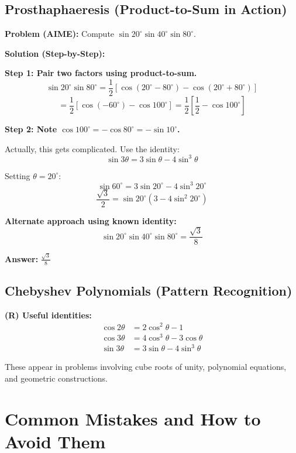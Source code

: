 \documentclass[12pt]{extarticle}
\begin{document}
\subsection{Prosthaphaeresis (Product-to-Sum in Action)}

\begin{examplebox}
\textbf{Problem (AIME):} Compute $\sin 20^\circ \sin 40^\circ \sin 80^\circ$.

\textbf{Solution (Step-by-Step):}

\textbf{Step 1: Pair two factors using product-to-sum.}
\[
\sin 20^\circ \sin 80^\circ = \frac{1}{2}[\cos(20^\circ - 80^\circ) - \cos(20^\circ + 80^\circ)]
\]
\[
= \frac{1}{2}[\cos(-60^\circ) - \cos 100^\circ] = \frac{1}{2}\left[\frac{1}{2} - \cos 100^\circ\right]
\]

\textbf{Step 2: Note $\cos 100^\circ = -\cos 80^\circ = -\sin 10^\circ$.}

Actually, this gets complicated. Use the identity:
\[
\sin 3\theta = 3\sin\theta - 4\sin^3\theta
\]

Setting $\theta = 20^\circ$:
\[
\sin 60^\circ = 3\sin 20^\circ - 4\sin^3 20^\circ
\]
\[
\frac{\sqrt{3}}{2} = \sin 20^\circ(3 - 4\sin^2 20^\circ)
\]

\textbf{Alternate approach using known identity:}
\[
\sin 20^\circ \sin 40^\circ \sin 80^\circ = \frac{\sqrt{3}}{8}
\]

\textbf{Answer:} $\boxed{\frac{\sqrt{3}}{8}}$
\end{examplebox}

\subsection{Chebyshev Polynomials (Pattern Recognition)}

\begin{conceptbox}
\textbf{(R) Useful identities:}
\begin{align*}
\cos 2\theta &= 2\cos^2\theta - 1 \\
\cos 3\theta &= 4\cos^3\theta - 3\cos\theta \\
\sin 3\theta &= 3\sin\theta - 4\sin^3\theta
\end{align*}

These appear in problems involving cube roots of unity, polynomial equations, and geometric constructions.
\end{conceptbox}

\section{Common Mistakes and How to Avoid Them}
\end{document}
